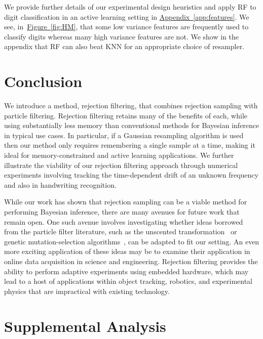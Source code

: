 \documentclass{article} %
\newcommand{\app}[1]{\hyperref[app:#1]{Appendix~\ref*{app:#1}}}
\newcommand{\fig}[1]{\hyperref[fig:#1]{Figure~\ref*{fig:#1}}}
\begin{document}
We provide further details of our experimental design heuristics and apply RF to digit classification in an active learning setting in \app{features}.  We see,  in~\fig{HM}, that some low variance features are frequently used to classify digits whereas many high variance features are not.  We show in the appendix that RF can also beat KNN  for an appropriate choice of resampler.

\section{Conclusion}
\label{sec:conclusions}

We introduce a method, rejection filtering, that combines
rejection sampling with particle filtering. Rejection filtering retains many of the benefits
of each, while using substantially less memory than conventional methods for Bayesian inference in typical use cases.
In particular, if a Gaussian resampling algorithm is used then our method only requires remembering a single sample at a time, making it ideal
for memory-constrained and active learning applications.
We further illustrate the viability of our rejection filtering approach through numerical experiments
involving tracking the time-dependent drift of an unknown frequency and also in handwriting recognition.

While our work has shown that rejection sampling can be a viable method for performing Bayesian inference, there are many
avenues for future work that remain open.  One such avenue involves investigating whether ideas borrowed from the particle
filter literature, such as the unscented transformation~\cite{van2000unscented} or genetic mutation-selection algorithms~\cite{del2012adaptive,del2000branching}, can be adapted to fit our setting.  An even more exciting
application of these ideas may be to examine their application in online data acquisition in science and engineering.  Rejection
filtering provides the ability to perform adaptive experiments using embedded hardware, which may lead to a host of applications
within object tracking, robotics, and experimental physics that are impractical with existing technology.


\appendix

\section{Supplemental Analysis}
\end{document}

